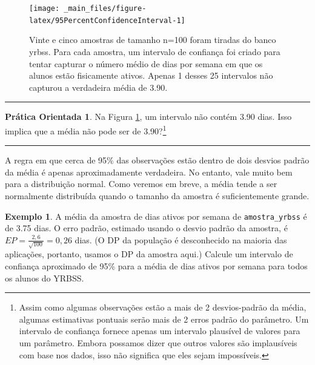 \documentclass[
]{book}
\theoremstyle{definition}
\theoremstyle{definition}
\newtheorem{example}{Exemplo}[chapter]
\theoremstyle{definition}
\newtheorem{exercise}{Prática Orientada}[chapter]
\theoremstyle{definition}
\theoremstyle{remark}
\begin{document}
\begin{figure}

{\centering \texttt{[image: \_main\_files/figure-latex/95PercentConfidenceInterval-1]} 

}

\caption{Vinte e cinco amostras de tamanho n=100 foram tiradas do banco yrbss. Para cada amostra, um intervalo de confiança foi criado para tentar capturar o número médio de dias por semana em que os alunos estão fisicamente ativos. Apenas 1 desses 25 intervalos não capturou a verdadeira média de 3.90.}\label{fig:95PercentConfidenceInterval}
\end{figure}

\begin{center}\rule{0.5\linewidth}{0.5pt}\end{center}

\begin{exercise}
\protect\hypertarget{exr:unnamed-chunk-155}{}{\label{exr:unnamed-chunk-155} }Na Figura \ref{fig:95PercentConfidenceInterval}, um intervalo não contém 3.90 dias. Isso implica que a média não pode ser de 3.90?\footnote{Assim como algumas observações estão a mais de 2 desvios-padrão da média, algumas estimativas pontuais serão mais de 2 erros padrão do parâmetro. Um intervalo de confiança fornece apenas um intervalo plausível de valores para um parâmetro. Embora possamos dizer que outros valores são implausíveis com base nos dados, isso não significa que eles sejam impossíveis.}
\end{exercise}

\begin{center}\rule{0.5\linewidth}{0.5pt}\end{center}

A regra em que cerca de 95\% das observações estão dentro de dois desvios padrão da média é apenas aproximadamente verdadeira. No entanto, vale muito bem para a distribuição normal. Como veremos em breve, a média tende a ser normalmente distribuída quando o tamanho da amostra é suficientemente grande.

\begin{example}
\protect\hypertarget{exm:unnamed-chunk-156}{}{\label{exm:unnamed-chunk-156} }A média da amostra de dias ativos por semana de \texttt{amostra\_yrbss} é de 3.75 dias. O erro padrão, estimado usando o desvio padrão da amostra, é \(EP=\frac{2,6}{\sqrt{100}} = 0,26\) dias. (O DP da população é desconhecido na maioria das aplicações, portanto, usamos o DP da amostra aqui.) Calcule um intervalo de confiança aproximado de 95\% para a média de dias ativos por semana para todos os alunos do YRBSS.
\end{example}
\end{document}

